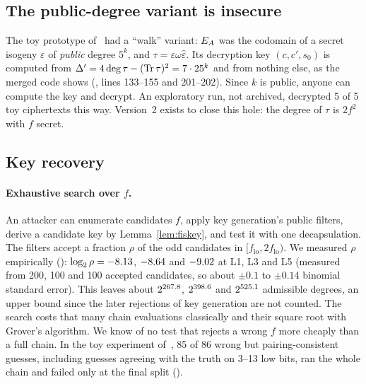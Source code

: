 \subsection{The public-degree variant is insecure}\label{sec:walk}

The toy prototype of~\cite{EigenSetaNote} had a ``walk'' variant: $E_A$ was
the codomain of a secret isogeny $\varepsilon$ of \emph{public} degree $5^k$,
and $\tau=\varepsilon\omega\hat\varepsilon$. Its decryption key
$(c,c',s_0)$ is computed from $\Delta'=4\deg\tau-(\operatorname{Tr}\tau)^2=7\cdot25^k$ and
from nothing else, as the merged code shows
(,
lines 133--155 and 201--202). Since $k$ is public, anyone can compute the key
and decrypt. An exploratory run, not archived, decrypted 5 of 5 toy
ciphertexts this way. Version~2 exists to close this hole: the degree of
$\tau$ is $2f^2$ with $f$ secret.

\subsection{Key recovery}\label{sec:key}

\paragraph{Exhaustive search over $f$.} An attacker can enumerate candidates
$f$, apply key generation's public filters, derive a candidate key by
Lemma~\ref{lem:fiskey}, and test it with one decapsulation. The filters
accept a fraction $\rho$ of the odd candidates in $[f_{\mathrm{lo}},2f_{\mathrm{lo}})$.
We measured $\rho$ empirically
():
$\log_2\rho=-8.13$, $-8.64$ and $-9.02$ at L1, L3 and L5 (measured from 200, 100 and 100 accepted candidates, so about $\pm0.1$ to $\pm0.14$ binomial standard error). This
leaves about $2^{267.8}$, $2^{398.6}$ and $2^{525.1}$
admissible degrees, an upper bound since the later rejections of key
generation are not counted. The search costs that many chain evaluations
classically and their square root with Grover's algorithm. We know of no
test that rejects a wrong $f$ more cheaply than a full chain. In the toy
experiment of~\cite[\S6]{EigenSetaNote}, 85 of 86 wrong but
pairing-consistent guesses, including guesses agreeing with the truth on
3--13 low bits, ran the whole chain and failed only at the final split
().

